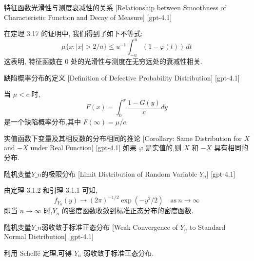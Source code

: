 \documentclass[UTF8]{ctexart}
\begin{document}
    
    
    \begin{thm}
        {特征函数光滑性与测度衰减性的关系}
        [Relationship between Smoothness of Characteristic Function and Decay of Measure]
        [gpt-4.1]
        
在定理 3.17 的证明中, 我们得到了如下不等式:
\[
\mu\{ x : |x| > 2/u \} \leq u^{-1} \int_{-u}^u (1 - \varphi(t)) \, dt
\]
这表明, 特征函数在 $0$ 处的光滑性与测度在无穷远处的衰减性相关.

    \end{thm}
    
    
    
    \begin{dfn}
        {缺陷概率分布的定义}
        [Definition of Defective Probability Distribution]
        [gpt-4.1]
        
当 $\mu < c$ 时,
\[
F(x) = \int_{0}^{x} \frac{1-G(y)}{c} dy
\]
是一个缺陷概率分布,其中 $F(\infty) = \mu / c$.

    \end{dfn}
    
    
    
    \begin{crl}
        {实值函数下变量及其相反数的分布相同的推论}
        [Corollary: Same Distribution for $X$ and $-X$ under Real Function]
        [gpt-4.1]
        如果 $\varphi$ 是实值的,则 $X$ 和 $-X$ 具有相同的分布.
    \end{crl}
    
    
    
    \begin{thm}
        {随机变量$Y\_n$的极限分布}
        [Limit Distribution of Random Variable $Y_n$]
        [gpt-4.1]
        
由定理 3.1.2 和引理 3.1.1 可知,
\[
f_{Y_n}(y) \to (2\pi)^{-1/2} \exp(-y^2/2) \quad \mathrm{as} \ n \to \infty
\]
即当 $n \to \infty$ 时,$Y_n$ 的密度函数收敛到标准正态分布的密度函数.

    \end{thm}
    
    
    
    \begin{crl}
        {随机变量$Y\_n$弱收敛于标准正态分布}
        [Weak Convergence of $Y_n$ to Standard Normal Distribution]
        [gpt-4.1]
        
利用 Scheffé 定理,可得 $Y_n$ 弱收敛于标准正态分布.

    \end{crl}
    
\end{document}
